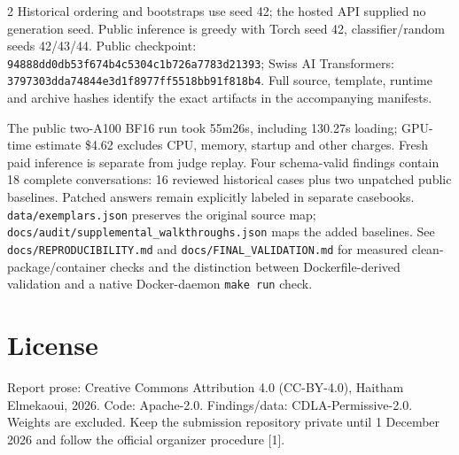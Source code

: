 \documentclass[10pt,a4paper]{article}
\newcommand{\pathtext}[1]{\nolinkurl{#1}}
\begin{document}
\begin{multicols}{2}
Historical ordering and bootstraps use seed 42; the hosted API supplied no generation seed. Public inference is greedy with Torch seed 42, classifier/random seeds 42/43/44. Public checkpoint: \pathtext{94888dd0db53f674b4c5304c1b726a7783d21393}; Swiss AI Transformers: \pathtext{3797303dda74844e3d1f8977ff5518bb91f818b4}. Full source, template, runtime and archive hashes identify the exact artifacts in the accompanying manifests.

The public two-A100 BF16 run took 55m26s, including 130.27s loading; GPU-time estimate \$4.62 excludes CPU, memory, startup and other charges. Fresh paid inference is separate from judge replay. Four schema-valid findings contain 18 complete conversations: 16 reviewed historical cases plus two unpatched public baselines. Patched answers remain explicitly labeled in separate casebooks. \pathtext{data/exemplars.json} preserves the original source map; \pathtext{docs/audit/supplemental_walkthroughs.json} maps the added baselines. See \pathtext{docs/REPRODUCIBILITY.md} and \pathtext{docs/FINAL_VALIDATION.md} for measured clean-package/container checks and the distinction between Dockerfile-derived validation and a native Docker-daemon \texttt{make run} check.

\section{License}
Report prose: Creative Commons Attribution 4.0 (CC-BY-4.0), Haitham Elmekaoui, 2026. Code: Apache-2.0. Findings/data: CDLA-Permissive-2.0. Weights are excluded. Keep the submission repository private until 1 December 2026 and follow the official organizer procedure [1].

\end{multicols}
\end{document}
